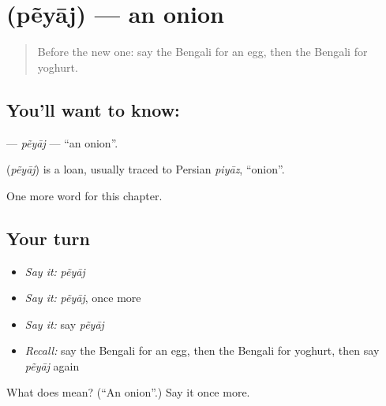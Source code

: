\section[\texorpdfstring{\bn{পেঁয়াজ} (pẽyāj)}{পেঁয়াজ (pẽyāj)}]{ (pẽyāj) — an onion}

\label{lesson:BN-C58-peyaj}



\begin{quote}
Before the new one: say the Bengali for an egg, then the Bengali for yoghurt.
\end{quote}

\subsection*{You'll want to know: }
\textbf{} — \emph{pẽyāj} — \textquotedblleft{}an onion\textquotedblright{}.

\begin{cousinweb}
\textbf{} (\emph{pẽyāj}) is a loan, usually traced to Persian \emph{piyāz}, \textquotedblleft{}onion\textquotedblright{}.
\end{cousinweb}

\begin{grammarlens}[title={What you've built}]
One more word for this chapter.
\end{grammarlens}

\subsection*{Your turn}
\begin{itemize}
\raggedright
  \item \emph{Say it:} \emph{pẽyāj}
  \item \emph{Say it:} \emph{pẽyāj}, once more
  \item \emph{Say it:} say \emph{pẽyāj}
  \item \emph{Recall:} say the Bengali for an egg, then the Bengali for yoghurt, then say \emph{pẽyāj} again
\end{itemize}

\begin{tcolorbox}[breakable,colback=teal!4,colframe=teal!35!black,title={Before you move on}]
What does  mean? (\textquotedblleft{}An onion\textquotedblright{}.) Say it once more.
\end{tcolorbox}

